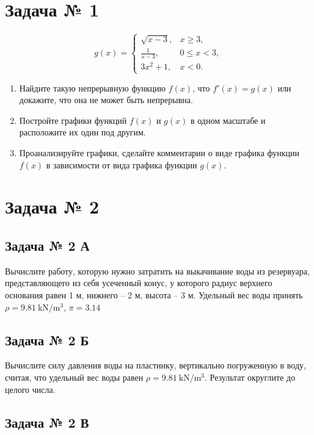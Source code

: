 \documentclass[a4paper,12pt]{article}
\begin{document}
\section{Задача № 1}

\[
  g(x) =
  \begin{cases}
    \sqrt{x - 3}, & x \ge 3, \\
    \frac{1}{x - 3}, & 0 \le x < 3, \\
    3 x^2 + 1, & x < 0.
  \end{cases}
\]

\begin{enumerate}
\item Найдите такую непрерывную функцию \(f(x)\), что \(f'(x) = g(x)\) или докажите, что она
    не может быть непрерывна.
\item Постройте графики функций \(f(x)\) и \(g(x)\) в одном масштабе и расположите их один под другим.
\item Проанализируйте графики, сделайте комментарии о виде графика функции \(f(x)\) в зависимости от вида графика функции \(g(x)\).
\end{enumerate}

\section{Задача № 2}

\subsection{Задача № 2 А}

Вычислите работу, которую нужно затратить на выкачивание воды из резервуара, представляющего из себя усеченный конус, у которого радиус верхнего основания равен 1 м, нижнего – 2 м, высота – 3 м. Удельный вес воды принять \(\rho = \SI{9.81}{\kN\per\cubic\metre}\), \(\pi = \num{3.14}\)

\subsection{Задача № 2 Б}

Вычислите силу давления воды на пластинку, вертикально погруженную в воду, считая, что удельный вес воды равен \(\rho = \SI{9.81}{\kN\per\cubic\metre}\). Результат округлите до целого числа.

\subsection{Задача № 2 В}
\end{document}
